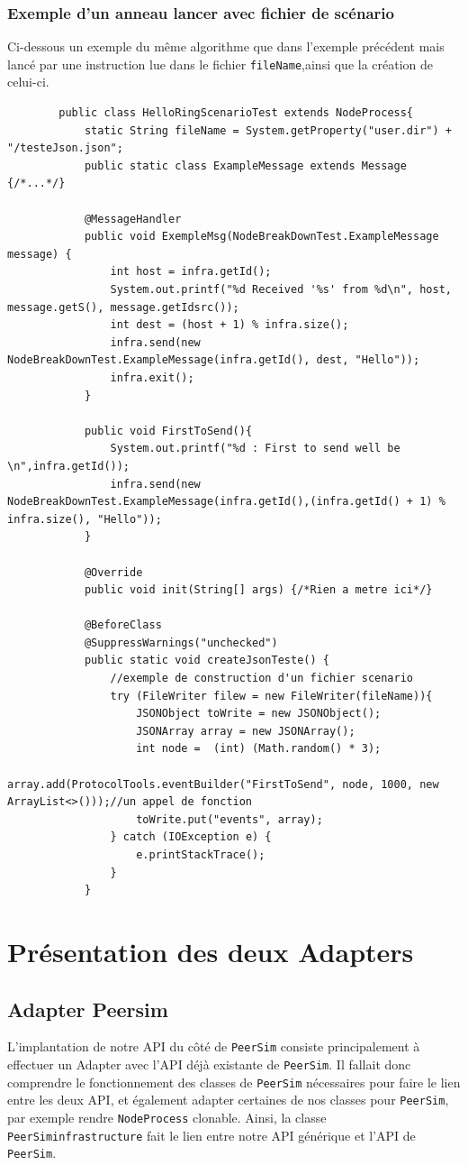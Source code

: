 \documentclass{article}
\begin{document}
							\subsubsection{Exemple d'un anneau lancer avec fichier de scénario}
						Ci-dessous un exemple du même algorithme que dans l'exemple précédent mais lancé par une instruction lue dans le fichier \verb|fileName|,ainsi que 
						la création de celui-ci.
						\begin{lstlisting}
		public class HelloRingScenarioTest extends NodeProcess{
			static String fileName = System.getProperty("user.dir") + "/testeJson.json";
			public static class ExampleMessage extends Message {/*...*/}
		
			@MessageHandler
			public void ExempleMsg(NodeBreakDownTest.ExampleMessage message) {
				int host = infra.getId();
				System.out.printf("%d Received '%s' from %d\n", host, message.getS(), message.getIdsrc());
				int dest = (host + 1) % infra.size();
				infra.send(new NodeBreakDownTest.ExampleMessage(infra.getId(), dest, "Hello"));
				infra.exit();
			}
		
			public void FirstToSend(){
				System.out.printf("%d : First to send well be \n",infra.getId());
				infra.send(new NodeBreakDownTest.ExampleMessage(infra.getId(),(infra.getId() + 1) % infra.size(), "Hello"));
			}
		
			@Override
			public void init(String[] args) {/*Rien a metre ici*/}
			
			@BeforeClass
			@SuppressWarnings("unchecked")
			public static void createJsonTeste() {
				//exemple de construction d'un fichier scenario
				try (FileWriter filew = new FileWriter(fileName)){
					JSONObject toWrite = new JSONObject();
					JSONArray array = new JSONArray();
					int node =  (int) (Math.random() * 3);
					array.add(ProtocolTools.eventBuilder("FirstToSend", node, 1000, new ArrayList<>()));//un appel de fonction
					toWrite.put("events", array);
				} catch (IOException e) {
					e.printStackTrace();
				}
			}
						\end{lstlisting}
						\newpage
							
		
						\section{Présentation des deux Adapters}
						
						\subsection{Adapter Peersim}
						L'implantation de notre API du côté de \verb|PeerSim| consiste principalement à effectuer un Adapter avec l'API déjà existante de \verb|PeerSim|. Il fallait donc comprendre le fonctionnement des classes de \verb|PeerSim| nécessaires pour faire le lien entre les deux API,  
						et également adapter certaines de nos classes pour \verb|PeerSim|, par exemple rendre \verb|NodeProcess| clonable. 
						\newline
						Ainsi, la classe \verb|PeerSiminfrastructure| fait le lien entre notre API générique et l'API de \verb|PeerSim|.
\end{document}
